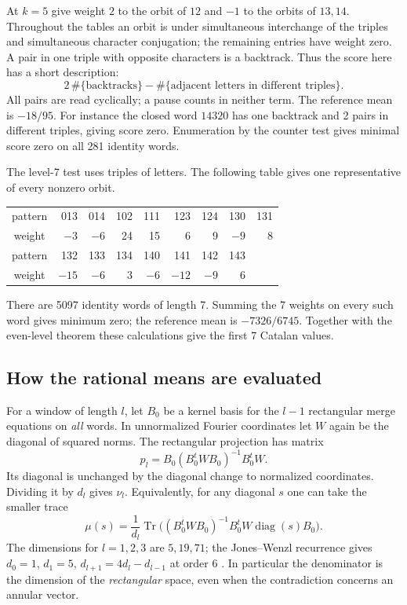 \documentclass[11pt,a4paper]{amsart}
\newcommand{\Tr}{\operatorname{Tr}}
\begin{document}
At $k=5$ give weight $2$ to the orbit of $12$ and $-1$ to the orbits of $13,14$. Throughout the tables an orbit is under simultaneous interchange of the triples and simultaneous character conjugation; the remaining entries have weight zero. A pair in one triple with opposite characters is a backtrack. Thus the score here has a short description:
\[
 2\,\#\{\text{backtracks}\}
      -\#\{\text{adjacent letters in different triples}\}.
\]
All pairs are read cyclically; a pause counts in neither term. The reference mean is $-18/95$. For instance the closed word $14320$ has one backtrack and 2 pairs in different triples, giving score zero. Enumeration by the counter test gives minimal score zero on all 281 identity words.

The level-7 test uses triples of letters. The following table gives one representative of every nonzero orbit.
\begin{center}\small
\begin{tabular}{c|rrrrrrrr}
pattern &013&014&102&111&123&124&130&131\\
weight &$-3$&$-6$&24&15&6&9&$-9$&8\\ \midrule
pattern &132&133&134&140&141&142&143&\\
weight &$-15$&$-6$&3&$-6$&$-12$&$-9$&6&
\end{tabular}
\end{center}
There are 5097 identity words of length 7. Summing the 7 weights on every such word gives minimum zero; the reference mean is $-7326/6745$. Together with the even-level theorem these calculations give the first 7 Catalan values.

\subsection{How the rational means are evaluated}
For a window of length $l$, let $B_0$ be a kernel basis for the $l-1$ rectangular merge equations on \emph{all} words. In unnormalized Fourier coordinates let $W$ again be the diagonal of squared norms. The rectangular projection has matrix
\[
 p_l=B_0(B_0^tWB_0)^{-1}B_0^tW .
\]
Its diagonal is unchanged by the diagonal change to normalized coordinates. Dividing it by $d_l$ gives $\nu_l$. Equivalently, for any diagonal $s$ one can take the smaller trace
\[
 \mu(s)=\frac1{d_l}\Tr\big((B_0^tWB_0)^{-1}B_0^tW
                 \operatorname{diag}(s)B_0\big).
\]
The dimensions for $l=1,2,3$ are $5,19,71$; the Jones--Wenzl recurrence gives $d_0=1$, $d_1=5$, $d_{l+1}=4d_l-d_{l-1}$ at order 6 \cite[Section 9]{bo}. In particular the denominator is the dimension of the \emph{rectangular} space, even when the contradiction concerns an annular vector.
\end{document}

